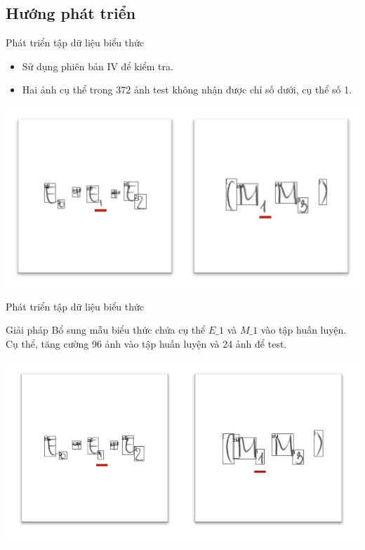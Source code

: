 \documentclass{beamer}
\begin{document}
	\subsection{Hướng phát triển}
	\begin{frame}{Phát triển tập dữ liệu biểu thức}
		\begin{itemize}
			\item Sử dụng phiên bản IV để kiểm tra.
			\item Hai ảnh cụ thể trong 372 ảnh test không nhận được chỉ số dưới, cụ thể số 1.
		\end{itemize}
		\begin{center}
			\centering
			\includegraphics[width=0.6\linewidth]{M1E1}
			\vspace{0.5cm}
			\label{fig: m1}
		\end{center}
	\end{frame}
	\begin{frame}{Phát triển tập dữ liệu biểu thức}
	\begin{block}{Giải pháp}
		Bổ sung mẫu biểu thức chứa cụ thể $E\_1$ và $M\_1$ vào tập huấn luyện. Cụ thể, tăng cường 96 ảnh vào tập huấn luyện và 24 ảnh để test.
	\end{block}
	\begin{center}
		\centering
		\includegraphics[width=0.7\linewidth]{M1E1_res}
		\vspace{0.5cm}
	\end{center}
	\end{frame}
\end{document}
